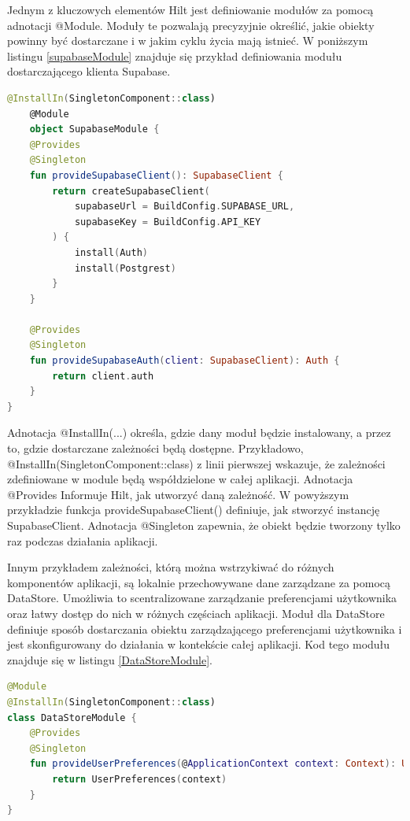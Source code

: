 \documentclass[12pt,twoside]{article}
\begin{document}
Jednym z kluczowych elementów Hilt jest definiowanie modułów za pomocą adnotacji @Module. Moduły te pozwalają 
precyzyjnie określić, jakie obiekty powinny być dostarczane i w jakim cyklu życia mają istnieć. W poniższym listingu
\ref{supabaseModule} znajduje się przykład definiowania modułu dostarczającego klienta Supabase.
\begin{lstlisting}[language=Kotlin,caption=Przykład modułu klienta Supabase, label={supabaseModule}]
	@InstallIn(SingletonComponent::class)
	@Module
	object SupabaseModule {
    @Provides
    @Singleton
    fun provideSupabaseClient(): SupabaseClient {
        return createSupabaseClient(
            supabaseUrl = BuildConfig.SUPABASE_URL,
            supabaseKey = BuildConfig.API_KEY
        ) {
            install(Auth)
            install(Postgrest)
        }
    }

    @Provides
    @Singleton
    fun provideSupabaseAuth(client: SupabaseClient): Auth {
        return client.auth
    }
}
\end{lstlisting}
Adnotacja @InstallIn(...) określa, gdzie dany moduł będzie instalowany, a przez to, gdzie dostarczane zależności 
będą dostępne. Przykładowo, @InstallIn(SingletonComponent::class) z linii pierwszej wskazuje, że zależności 
zdefiniowane w module będą współdzielone w całej aplikacji. Adnotacja @Provides
Informuje Hilt, jak utworzyć daną zależność. W powyższym przykładzie funkcja provideSupabaseClient() definiuje, jak 
stworzyć instancję SupabaseClient. Adnotacja @Singleton zapewnia, że obiekt będzie tworzony tylko raz podczas działania 
aplikacji.

Innym przykładem zależności, którą można wstrzykiwać do różnych komponentów aplikacji, są lokalnie przechowywane 
dane zarządzane za pomocą DataStore. Umożliwia to scentralizowane zarządzanie preferencjami użytkownika oraz łatwy 
dostęp do nich w różnych częściach aplikacji. Moduł dla DataStore definiuje sposób dostarczania obiektu zarządzającego 
preferencjami użytkownika i jest skonfigurowany do działania w kontekście całej aplikacji. Kod tego modułu znajduje 
się w listingu \ref{DataStoreModule}.

\begin{lstlisting}[language=Kotlin,caption=Przykład modułu DataStore, label={DataStoreModule}]
@Module
@InstallIn(SingletonComponent::class)
class DataStoreModule {
    @Provides
    @Singleton
    fun provideUserPreferences(@ApplicationContext context: Context): UserPreferences {
        return UserPreferences(context)
    }
}
\end{lstlisting}
\end{document}

